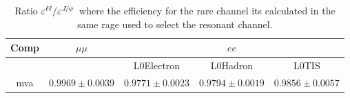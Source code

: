 \begin{table}[h!]
\begin{tabular}{|c|c|c|c|c|}
\hline Comp 			&  $\mu\mu$  				& \multicolumn {3}{c|}{$ee$}  \\ \hline
				&   &  L0Electron 	& L0Hadron 	& L0TIS \\ \hline
mva  & $ 0.9969  \pm  0.0039 $ & $ 0.9771  \pm  0.0023 $ & $ 0.9794  \pm  0.0019 $ & $ 0.9856  \pm  0.0057 $ \\ 
\hline
\end{tabular}
\caption{Ratio $\varepsilon^{\ell\ell} / \varepsilon^{\jpsi}$ where the efficiency for the
rare channel its calculated in the same \qsq rage used to select the resonant channel.}
\label{tab:mva_in_jpsibin}
\end{table}

\clearpage








